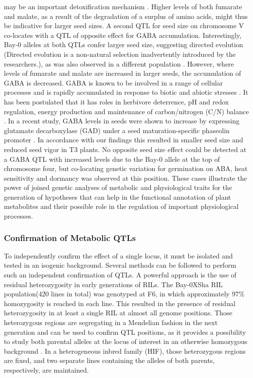 may be an important detoxification mechanism \cite{Fujiki:2000}. Higher levels of both fumarate and malate, 
as a result of the degradation of a surplus of amino acids, might thus be indicative for larger seed sizes. A 
second QTL for seed size on chromosome V co-locates with a QTL of opposite effect for GABA accumulation. 
Interestingly, Bay-0 alleles at both QTLs confer larger seed size, suggesting directed evolution (Directed 
evolution is a non-natural selection inadvertently introduced by the researchers.), as was also observed in 
a different population \cite{Alonso-Blanco:1999}. However, where levels of fumarate and malate are increased 
in larger seeds, the accumulation of GABA is decreased. GABA is known to be involved in a range of cellular 
processes \cite{Palanivelu:2003} and is rapidly accumulated in response to biotic and abiotic stresses 
\cite{Kinnersley:2000}. It has been postulated that it has roles in herbivore deterrence, pH and redox 
regulation, energy production and maintenance of carbon/nitrogen (C/N) balance \cite{Bouche:2004}. In a 
recent study, GABA levels in seeds were shown to increase by expressing glutamate decarboxylase (GAD) under a 
seed maturation-specific phaseolin promoter \cite{Fait:2011}. In accordance with our findings this resulted 
in smaller seed size and reduced seed vigor in T3 plants. No opposite seed size effect could be detected at a 
GABA QTL with increased levels due to the Bay-0 allele at the top of chromosome four, but co-locating genetic 
variation for germination on ABA, heat sensitivity and dormancy was observed at this position. These cases 
illustrate the power of joined genetic analyses of metabolic and physiological traits for the generation of 
hypotheses that can help in the functional annotation of plant metabolites and their possible role in the 
regulation of important physiological processes.

\subsubsection{Confirmation of Metabolic QTLs}
To independently confirm the effect of a single locus, it must be isolated and tested in an isogenic 
background. Several methods can be followed to perform such an independent confirmation of QTLs. A 
powerful approach is the use of residual heterozygosity in early generations of RILs. The Bay-0XSha 
RIL population(420 lines in total) was genotyped at F6, in which approximately 97\% homozygosity is 
reached in each line. This resulted in the presence of residual heterozygosity in at least a single 
RIL at almost all genome positions. Those heterozygous regions are segregating in a Mendelian fashion 
in the next generation and can be used to confirm QTL positions, as it provides a possibility to
study both parental alleles at the locus of interest in an otherwise homozygous background 
\cite{Tuinstra:1997}. In a heterogeneous inbred family (HIF), those heterozygous regions are fixed, 
and two separate lines containing the alleles of both parents, respectively, are maintained.

